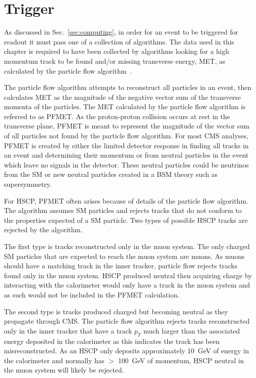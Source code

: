 \section{Trigger \label{sec:trigger}}
As discussed in Sec.~\ref{sec:computing}, in order for an event to be triggered for readout it must pass one of a collection of algorithms.
The data used in this chapter is required to have been collected by algorithms looking for a high momentum track to be found
and/or missing transverse energy, MET, as calculated by the particle flow algorithm~\cite{CMS:2010xta}. 

The particle flow algorithm attempts
to reconstruct all particles in an event, then calculates MET as the magnitude of the negative vector sum of the transverse momenta of the particles. 
The MET calculated by the particle flow algorithm is referred to as PFMET.
As the proton-proton collision occurs
at rest in the transverse plane, PFMET is meant to represent the magnitude of the vector sum of all particles not found by the particle flow algorithm.
For most CMS analyses, PFMET is created
by either the limited detector response in finding all tracks in an event and determining their momentum or from neutral particles in the event which leave no signals
in the detector. These neutral particles could be neutrinos from the SM or new neutral particles created in a BSM theory such as supersymmetry. 

For HSCP, PFMET often arises because of details of the particle flow algorithm. The algorithm assumes SM particles and rejects tracks that do not conform to the properties expected
of a SM particle. Two types of possible HSCP tracks are rejected by the algorithm. 

The first type is tracks reconstructed only in the muon system. The only charged SM particles that
are expected to reach the muon system are muons. As muons should have a matching track in the inner tracker, particle flow rejects tracks found only in the
muon system. HSCP produced neutral then acquiring charge by interacting with the calorimeter
would only have a track in the muon system and as such would not be included in the PFMET calculation. 

The second type is tracks produced charged but becoming neutral as they propagate through CMS.
The particle flow algorithm rejects tracks reconstructed only in the inner tracker that have a track $p_T$ much larger
than the associated energy deposited in the calorimeter as this indicates the track has been misreconstructed.
As an HSCP only deposits approximately 10~GeV of energy in the calorimeter and normally has $>$ 100~GeV of momentum, HSCP neutral in the muon system will likely be rejected. 

